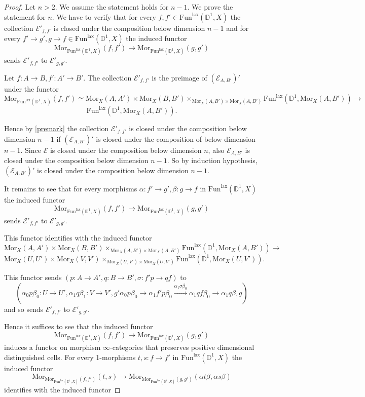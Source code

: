 \documentclass[10pt,oneside]{article}
\numberwithin{equation}{section} %
\numberwithin{figure}{section} %
\theoremstyle{plain}
\theoremstyle{definition}
\newcommand{\bD}{{\mathbb D}}
\newcommand{\mE}{{\mathcal E}}
\newcommand{\Fun}{\mathrm{Fun}}
\newcommand{\lax}{{\mathrm{lax}}}
\newcommand{\Mor}{{\mathrm{Mor}}}
\begin{document}
\begin{proof}
Let $n > 2.$ We assume the statement holds for $n-1.$ We prove the statement for $n.$
We have to verify that for every $f,f' \in \Fun^\lax(\bD^1, X)$ the collection $\mE'_{f,f'} $ is closed under the composition
below dimension $n-1$ and for every $ f' \to g', g \to f \in \Fun^\lax(\bD^1, X)$ the induced functor  
$$ \Mor_{\Fun^\lax(\bD^1, X)}(f,f') \to \Mor_{\Fun^\lax(\bD^1, X)}(g,g') $$ sends $\mE'_{f,f'} $ to $\mE'_{g,g'} $.

Let $f: A \to B ,f': A' \to B'$. The collection $\mE'_{f,f'} $ is the preimage of $(\mE_{A,B'})'$ under the functor 
$$ \Mor_{\Fun^\lax(\bD^1, X)}(f,f') \simeq \Mor_X(A,A') \times \Mor_X(B,B') \times_{\Mor_X(A,B') \times \Mor_X(A,B')} \Fun^\lax(\bD^1, \Mor_X(A,B')) \to $$$$ \Fun^\lax(\bD^1, \Mor_X(A,B')).$$

Hence by \cref{premark} the collection $\mE'_{f,f'} $ is closed under the composition 
below dimension $n-1$ 
if $ (\mE_{A,B'})' $ is closed under the composition of 
below dimension $n-1$.
Since $\mE$ is closed under the composition below dimension $n$, also $\mE_{A,B'} $ is closed under the composition below dimension $n-1$.
So by induction hypothesis, $ (\mE_{A,B'})' $ is closed under the composition below dimension $n-1$.

It remains to see that for every morphisms $\alpha: f' \to g', \beta: g \to f $ in $ \Fun^\lax(\bD^1, X)$ the induced functor   
$$ \Mor_{\Fun^\lax(\bD^1, X)}(f,f') \to \Mor_{\Fun^\lax(\bD^1, X)}(g,g') $$ sends $\mE'_{f,f'} $ to $\mE'_{g,g'} $.

This functor identifies with the induced functor
$$ \Mor_X(A,A') \times \Mor_X(B,B') \times_{\Mor_X(A,B') \times \Mor_X(A,B')} \Fun^\lax(\bD^1, \Mor_X(A,B')) \to $$$$ \Mor_X(U,U') \times \Mor_X(V,V') \times_{\Mor_X(U,V') \times \Mor_X(U,V')} \Fun^\lax(\bD^1, \Mor_X(U,V')).$$

This functor sends $ (p: A \to A', q:B \to B', \sigma: f' p \to q f) $ to $$ (\alpha_0 p \beta_0 : U \to U', \alpha_1 q \beta_1 :V \to V', g' \alpha_0 p \beta_0 \to \alpha_1 f' p \beta_0 \xrightarrow{\alpha_1 \sigma \beta_0} \alpha_1 q f \beta_0 \to \alpha_1 q \beta_1 g)$$
and so sends $\mE'_{f,f'} $ to $\mE'_{g,g'} $.

Hence it suffices to see that the induced functor   
$$ \Mor_{\Fun^\lax(\bD^1, X)}(f,f') \to \Mor_{\Fun^\lax(\bD^1, X)}(g,g') $$ induces a functor on morphism $\infty$-categories that preserves positive dimensional distinguished cells.
For every 1-morphisms 
$t, s: f \to f'$ in $\Fun^\lax(\bD^1, X) $ the induced functor
$$ \Mor_{\Mor_{\Fun^\lax(\bD^1, X)}(f,f')}(t,s) \to \Mor_{\Mor_{\Fun^\lax(\bD^1, X)}(g,g')}(\alpha t \beta , \alpha s \beta) $$
identifies with the induced functor



\end{proof}
\end{document}
